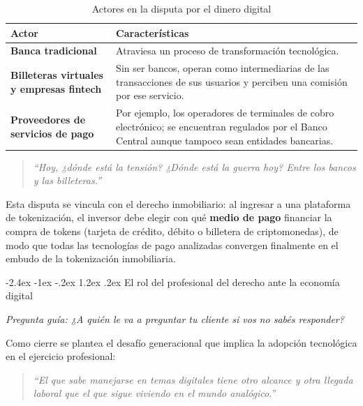 \documentclass[12pt,oneside]{book}
\makeatletter
\renewcommand\section{\@startsection{section}{1}{\z@}%
  {-2.4ex \@plus -1ex \@minus -.2ex}%
  {1.2ex \@plus .2ex}%
  {\normalfont\Large\bfseries\color{blue!50!black}}}
\newcommand{\guia}[1]{\noindent\textit{Pregunta guía: #1}\par\smallskip}
\makeatother
\begin{document}
\begin{table}[H]
\centering
\caption{Actores en la disputa por el dinero digital}
\renewcommand{\arraystretch}{1.25}
\small
\begin{tabularx}{\textwidth}{
    >{\raggedright\arraybackslash}p{}
    >{\raggedright\arraybackslash}X
}
\toprule
\textbf{Actor} & \textbf{Características} \\
\midrule
\textbf{Banca tradicional} & Atraviesa un proceso de transformación tecnológica. \\
\midrule[0.3pt]
\textbf{Billeteras virtuales y empresas fintech} & Sin ser bancos, operan como intermediarias de las transacciones de sus usuarios y perciben una comisión por ese servicio. \\
\midrule[0.3pt]
\textbf{Proveedores de servicios de pago} & Por ejemplo, los operadores de terminales de cobro electrónico; se encuentran regulados por el Banco Central aunque tampoco sean entidades bancarias. \\
\bottomrule
\end{tabularx}
\end{table}

\begin{quote}
\textit{``Hoy, ¿dónde está la tensión? ¿Dónde está la guerra hoy? Entre los bancos y las billeteras.''}
\end{quote}

Esta disputa se vincula con el derecho inmobiliario: al ingresar a una plataforma de tokenización, el inversor debe elegir con qué \textbf{medio de pago} financiar la compra de tokens (tarjeta de crédito, débito o billetera de criptomonedas), de modo que todas las tecnologías de pago analizadas convergen finalmente en el embudo de la tokenización inmobiliaria.

\section{El rol del profesional del derecho ante la economía digital}

\guia{¿A quién le va a preguntar tu cliente si vos no sabés responder?}

Como cierre se plantea el desafío generacional que implica la adopción tecnológica en el ejercicio profesional:

\begin{quote}
\textit{``El que sabe manejarse en temas digitales tiene otro alcance y otra llegada laboral que el que sigue viviendo en el mundo analógico.''}
\end{quote}
\end{document}
